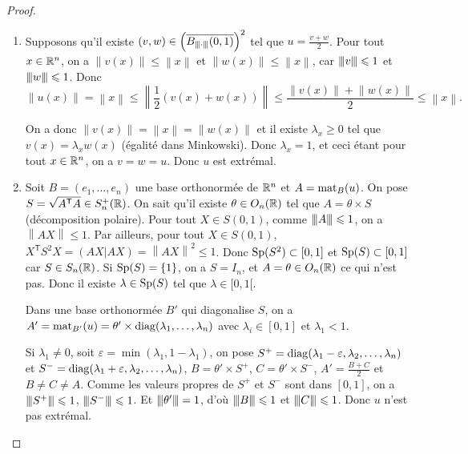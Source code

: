 \documentclass[12pt]{article}
\begin{document}
\begin{proof}
	\phantom{}
	\begin{enumerate}
		\item Supposons qu'il existe $(v,w)\in\left(\overline{B_{{\left\vert\kern-0.25ex\left\vert\kern-0.25ex\left\vert{}\cdot \right\vert\kern-0.25ex\right\vert\kern-0.25ex\right\vert}}(0,1)}\right)^{2}$ tel que $u=\frac{v+w}{2}$. Pour tout $x\in\mathbb{R}^{n}$, on a $\left\lVert v(x)\right\rVert\leqslant\left\lVert x\right\rVert$ et $\left\lVert w(x)\right\rVert\leqslant\left\lVert x\right\rVert$, car ${\left\vert\kern-0.25ex\left\vert\kern-0.25ex\left\vert{}v \right\vert\kern-0.25ex\right\vert\kern-0.25ex\right\vert}\leqslant1$ et ${\left\vert\kern-0.25ex\left\vert\kern-0.25ex\left\vert{}w \right\vert\kern-0.25ex\right\vert\kern-0.25ex\right\vert}\leqslant1$. Donc 
		\begin{equation}
			\left\lVert u(x)\right\rVert=\left\lVert x\right\rVert\leqslant\left\lVert\frac{1}{2}\left(v(x)+w(x)\right)\right\rVert\leqslant\frac{\left\lVert v(x)\right\rVert+\left\lVert w(x)\right\rVert}{2}\leqslant\left\lVert x\right\rVert.
		\end{equation}

		On a donc $\left\lVert v(x)\right\rVert=\left\lVert x\right\rVert=\left\lVert w(x)\right\rVert$ et il existe $\lambda_x\geqslant0$ tel que $v(x)=\lambda_x w(x)$ (égalité dans Minkowski). Donc $\lambda_x=1$, et ceci étant pour tout $x\in\mathbb{R}^{n}$, on a $v=w=u$. Donc $u$ est extrémal.

		\item Soit $B=(e_1,\dots,e_n)$ une base orthonormée de $\mathbb{R}^{n}$ et $A=\operatorname{mat}_{B}(u)$. On pose $S=\sqrt{A^{\mathsf{T}}A}\in S_n^{+}(\mathbb{R})$. On sait qu'il existe $\theta\in O_n(\mathbb{R})$ tel que $A=\theta\times S$ (décomposition polaire). Pour tout $X\in S(0,1)$, comme ${\left\vert\kern-0.25ex\left\vert\kern-0.25ex\left\vert{}A \right\vert\kern-0.25ex\right\vert\kern-0.25ex\right\vert}\leqslant1$, on a $\left\lVert AX\right\rVert\leqslant1$. Par ailleurs, pour tout $X\in S(0,1)$, $X^{\mathsf{T}}S^{2}X=(AX|AX)=\left\lVert AX\right\rVert^{2}\leqslant1$. Donc $\operatorname{Sp}(S^{2})\subset[0,1]$ et $\operatorname{Sp}(S)\subset[0,1]$ car $S\in S_n(\mathbb{R})$. Si $\operatorname{Sp}(S)=\left\lbrace1\right\rbrace$, on a $S=I_n$, et $A=\theta\in O_n(\mathbb{R})$ ce qui n'est pas. Donc il existe $\lambda\in\operatorname{Sp}(S)$ tel que $\lambda\in[0,1[$.
		
		Dans une base orthonormée $B'$ qui diagonalise $S$, on a $A'=\operatorname{mat}_{B'}(u)=\theta '\times\operatorname{diag}(\lambda_1,\dots,\lambda_n)$ avec $\lambda_i\in[0,1]$ et $\lambda_1<1$.

		Si $\lambda_{1}\neq0$, soit $\varepsilon=\min\left(\lambda_1,1-\lambda_1\right)$, on pose $S^{+}=\operatorname{diag}(\lambda_1-\varepsilon,\lambda_2,\dots,\lambda_n)$ et $S^{-}=\operatorname{diag}(\lambda_1+\varepsilon,\lambda_2,\dots,\lambda_n)$, $B=\theta'\times S^{+}$, $C=\theta'\times S^{-}$, $A'=\frac{B+C}{2}$ et $B\neq C\neq A$. Comme les valeurs propres de $S^{+}$ et $S^{-}$ sont dans $[0,1]$, on a ${\left\vert\kern-0.25ex\left\vert\kern-0.25ex\left\vert{}S^{+} \right\vert\kern-0.25ex\right\vert\kern-0.25ex\right\vert}\leqslant 1$, ${\left\vert\kern-0.25ex\left\vert\kern-0.25ex\left\vert{}S^{-} \right\vert\kern-0.25ex\right\vert\kern-0.25ex\right\vert}\leqslant1$. Et ${\left\vert\kern-0.25ex\left\vert\kern-0.25ex\left\vert{}\theta' \right\vert\kern-0.25ex\right\vert\kern-0.25ex\right\vert}=1$, d'où ${\left\vert\kern-0.25ex\left\vert\kern-0.25ex\left\vert{}B \right\vert\kern-0.25ex\right\vert\kern-0.25ex\right\vert}\leqslant1$ et ${\left\vert\kern-0.25ex\left\vert\kern-0.25ex\left\vert{}C \right\vert\kern-0.25ex\right\vert\kern-0.25ex\right\vert}\leqslant1$. Donc $u$ n'est pas extrémal.


\end{enumerate}
\end{proof}
\end{document}
